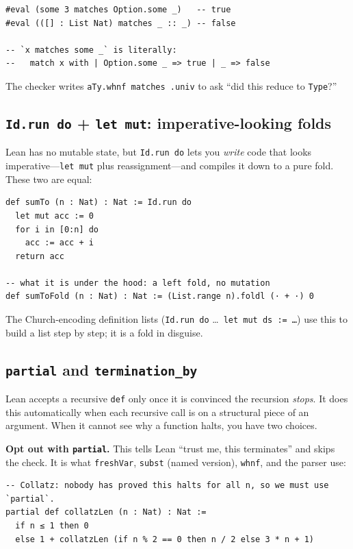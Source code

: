 \documentclass[11pt,a4paper]{article}
\theoremstyle{definition}
\begin{document}
\begin{verbatim}
#eval (some 3 matches Option.some _)   -- true
#eval (([] : List Nat) matches _ :: _) -- false

-- `x matches some _` is literally:
--   match x with | Option.some _ => true | _ => false
\end{verbatim}

The checker writes \texttt{aTy.whnf matches .univ} to ask ``did this reduce to
\texttt{Type}?''

\subsection*{\texttt{Id.run do} + \texttt{let mut}: imperative-looking folds}

Lean has no mutable state, but \texttt{Id.run do} lets you \emph{write} code that
looks imperative---\texttt{let mut} plus reassignment---and compiles it down to a
pure fold. These two are equal:

\begin{verbatim}
def sumTo (n : Nat) : Nat := Id.run do
  let mut acc := 0
  for i in [0:n] do
    acc := acc + i
  return acc

-- what it is under the hood: a left fold, no mutation
def sumToFold (n : Nat) : Nat := (List.range n).foldl (· + ·) 0
\end{verbatim}

The Church-encoding definition lists (\texttt{Id.run do} \ldots\ \texttt{let mut
ds := \ldots}) use this to build a list step by step; it is a fold in disguise.

\subsection*{\texttt{partial} and \texttt{termination\_by}}

Lean accepts a recursive \texttt{def} only once it is convinced the recursion
\emph{stops}. It does this automatically when each recursive call is on a
structural piece of an argument. When it cannot see why a function halts, you
have two choices.

\textbf{Opt out with \texttt{partial}.} This tells Lean ``trust me, this
terminates'' and skips the check. It is what \texttt{freshVar}, \texttt{subst}
(named version), \texttt{whnf}, and the parser use:

\begin{verbatim}
-- Collatz: nobody has proved this halts for all n, so we must use `partial`.
partial def collatzLen (n : Nat) : Nat :=
  if n ≤ 1 then 0
  else 1 + collatzLen (if n % 2 == 0 then n / 2 else 3 * n + 1)
\end{verbatim}
\end{document}
